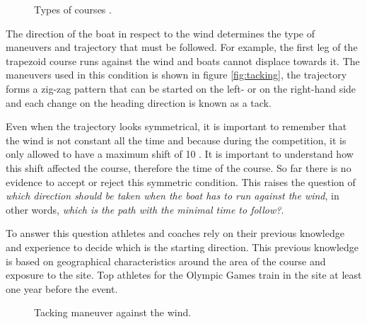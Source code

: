 \begin{figure}[ht]
  \centering
  \hfill
  \caption{Types of courses \cite{instr_rio}.}
\label{fig:typecourses} 
\end{figure}

The direction of the boat in respect to the wind determines the type of maneuvers and trajectory that must be followed. For example, the first leg of the trapezoid course runs against the wind and boats cannot displace towards it. The maneuvers used in this condition is shown in figure \ref{fig:tacking}, the trajectory forms a zig-zag pattern that can be started on the left- or on the right-hand side and each change on the heading direction is known as a tack. \par 

Even when the trajectory looks symmetrical, it is important to remember that the wind is not constant all the time and because during the competition, it is only allowed to have a maximum shift of 10 \degree \cite{race_pol}. It is important to understand how this shift affected the course, therefore the time of the course. So far there is no evidence to accept or reject this symmetric condition. This raises the question of \textit{which direction should be taken when the boat has to run against the wind}, in other words, \textit{which is the path with the minimal time to follow?}. \par \noindent
To answer this question athletes and coaches rely on their previous knowledge and experience to decide which is the starting direction. This previous knowledge is based on geographical characteristics around the area of the course and exposure to the site. Top athletes for the Olympic Games train in the site at least one year before the event.\par 
\begin{figure}[ht]
  \centering
  \hfill
   \centering
  \caption{Tacking maneuver against the wind.}
\label{fig:tack_against_wind} 
\end{figure}


